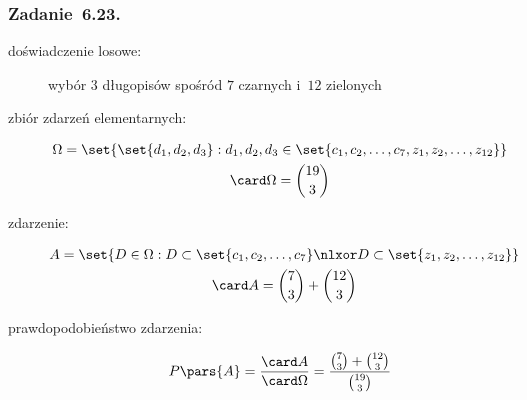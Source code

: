 \subsubsection*{Zadanie~6.23.}
\begin{description}
    \item[doświadczenie losowe:] wybór \(3\) długopisów spośród \(7\) czarnych i~\(12\) zielonych
    \item[zbiór zdarzeń elementarnych:]
        \begin{gather*}
            \Omega = \set{\set{d_1, d_2, d_3} : d_1, d_2, d_3 \in \set{c_1, c_2, \ldots, c_7, z_1, z_2, \ldots, z_{12}}}\\
            \card\Omega = \binom{19}{3}
        \end{gather*}
    \item[zdarzenie:]
        \begin{gather*}
            A = \set{D \in \Omega : D \subset \set{c_1, c_2, \ldots, c_7} \nlxor D \subset \set{z_1, z_2, \ldots, z_{12}}}\\
            \card A = \binom{7}{3} + \binom{12}{3}
        \end{gather*}
    \item[prawdopodobieństwo zdarzenia:]
        \begin{equation*}
            P\pars{A}
                = \frac{\card A}{\card\Omega}
                = \frac{\binom{7}{3} + \binom{12}{3}}{\binom{19}{3}}
        \end{equation*}
\end{description}

